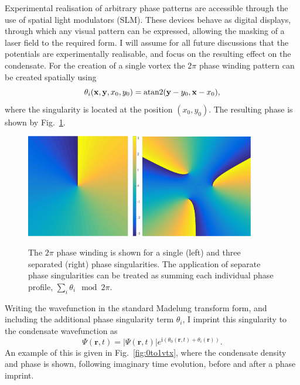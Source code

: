 Experimental realisation of arbitrary phase patterns are accessible through the use of spatial light modulators (SLM). These devices behave as digital displays, through which any visual pattern can be expressed, allowing the masking of a laser field to the required form. I will assume for all future discussions that the potentials are experimentally realisable, and focus on the resulting effect on the condensate. For the creation of a single vortex the $2\pi$ phase winding pattern can be created spatially using
\begin{equation}
    \theta_i(\mathbf{x},\mathbf{y},x_0,y_0) = \operatorname*{atan2}(\mathbf{y}-y_0,\mathbf{x}-x_0),
\end{equation}
where the singularity is located at the position $\left(x_0,y_0\right)$. The resulting phase is shown by Fig.~\ref{fig:atan2phase}.
\begin{figure}\centering
    \includegraphics[width=0.45\textwidth]{Images/ch4_vtx/2pi.pdf}
    \includegraphics[width=0.435\textwidth]{Images/ch4_vtx/3_2pi.pdf}
    \caption{The $2\pi$ phase winding is shown for a single (left) and three separated (right) phase singularities. The application of separate phase singularities can be treated as summing each individual phase profile, $\displaystyle\sum\limits_i \theta_i \mod 2\pi$.}\label{fig:atan2phase}
\end{figure}
Writing the wavefunction in the standard Madelung transform form, and including the additional phase singularity term $\theta_i$, I imprint this singularity to the condensate wavefunction as
\begin{equation}
    \Psi(\mathbf{r},t) = |\Psi(\mathbf{r},t)|e^{\text{i}(\theta_0(\mathbf{r},t) + \theta_i(\mathbf{r}))}.
\end{equation}
An example of this is given in Fig.~\ref{fig:0to1vtx}, where the condensate density and phase is shown, following imaginary time evolution, before and after a phase imprint.

